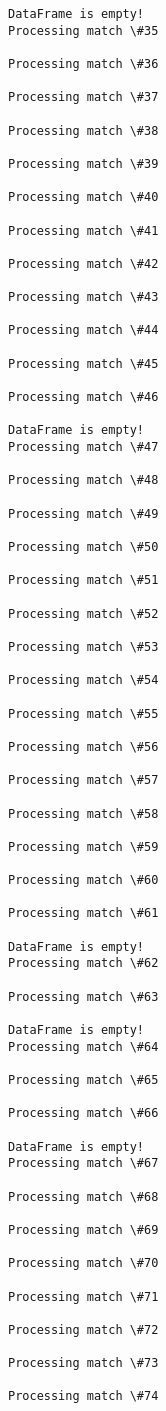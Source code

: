 \documentclass[11pt]{article}
\begin{document}
\begin{Verbatim}[commandchars=\\\{\}]
DataFrame is empty!
Processing match \#35

Processing match \#36

Processing match \#37

Processing match \#38

Processing match \#39

Processing match \#40

Processing match \#41

Processing match \#42

Processing match \#43

Processing match \#44

Processing match \#45

Processing match \#46

DataFrame is empty!
Processing match \#47

Processing match \#48

Processing match \#49

Processing match \#50

Processing match \#51

Processing match \#52

Processing match \#53

Processing match \#54

Processing match \#55

Processing match \#56

Processing match \#57

Processing match \#58

Processing match \#59

Processing match \#60

Processing match \#61

DataFrame is empty!
Processing match \#62

Processing match \#63

DataFrame is empty!
Processing match \#64

Processing match \#65

Processing match \#66

DataFrame is empty!
Processing match \#67

Processing match \#68

Processing match \#69

Processing match \#70

Processing match \#71

Processing match \#72

Processing match \#73

Processing match \#74


\end{Verbatim}
\end{document}
